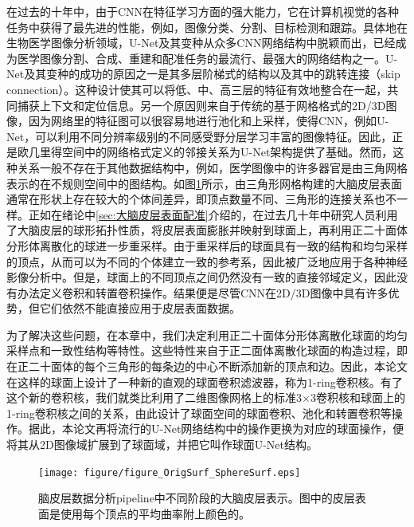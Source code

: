 在过去的十年中，由于CNN在特征学习方面的强大能力，它在计算机视觉的各种任务中获得了最先进的性能，例如，图像分类\cite{krizhevsky2012imagenet}、分割\cite{long2015fully}、目标检测和跟踪\cite{ren2015faster}。具体地在生物医学图像分析领域，U-Net\cite{ronneberger2015u}及其变种从众多CNN网络结构中脱颖而出，已经成为医学图像分割\cite{cciccek20163d}、合成\cite{nie2016estimating}、重建\cite{xiang2018ultra}和配准\cite{balakrishnan2018unsupervised}任务的最流行、最强大的网络结构之一。U-Net及其变种的成功的原因之一是其多层阶梯式的结构以及其中的跳转连接（skip connection）。这种设计使其可以将低、中、高三层的特征有效地整合在一起，共同捕获上下文和定位信息。另一个原因则来自于传统的基于网格格式的2D/3D图像，因为网络里的特征图可以很容易地进行池化和上采样，使得CNN，例如U-Net，可以利用不同分辨率级别的不同感受野分层学习丰富的图像特征。因此，正是欧几里得空间中的网络格式定义的邻接关系为U-Net架构提供了基础。然而，这种关系一般不存在于其他数据结构中，例如，医学图像中的许多器官是由三角网格表示的在不规则空间中的图结构。如图\ref{fig:figure_OrigSurf_SphereSurf}所示，由三角形网格\cite{dale1999cortical}构建的大脑皮层表面通常在形状上存在较大的个体间差异，即顶点数量不同、三角形的连接关系也不一样。正如在绪论中\ref{sec:大脑皮层表面配准}介绍的，在过去几十年中研究人员利用了大脑皮层的球形拓扑性质，将皮层表面膨胀并映射到球面上\cite{fischl2012freesurfer}，再利用正二十面体分形体离散化的球\cite{fischl1999cortical}进一步重采样。由于重采样后的球面具有一致的结构和均匀采样的顶点，从而可以为不同的个体建立一致的参考系，因此被广泛地应用于各种神经影像分析中\cite{li2019computational,glasser2013minimal}。但是，球面上的不同顶点之间仍然没有一致的直接邻域定义，因此没有办法定义卷积和转置卷积操作。结果便是尽管CNN在2D/3D图像中具有许多优势，但它们依然不能直接应用于皮层表面数据。

为了解决这些问题，在本章中，我们决定利用正二十面体分形体离散化球面的均匀采样点和一致性结构等特性。这些特性来自于正二面体离散化球面的构造过程，即在正二十面体的每个三角形的每条边的中心不断添加新的顶点和边\cite{fischl2012freesurfer}。因此，本论文在这样的球面上设计了一种新的直观的球面卷积滤波器，称为1-ring卷积核。有了这个新的卷积核，我们就类比利用了二维图像网格上的标准3$\times$3卷积核和球面上的1-ring卷积核之间的关系，由此设计了球面空间的球面卷积、池化和转置卷积等操作。据此，本论文再将流行的U-Net网络结构中的操作更换为对应的球面操作，便将其从2D图像域扩展到了球面域，并把它叫作球面U-Net结构。

\begin{figure}[t]
    \centering
    \texttt{[image: figure/figure\_OrigSurf\_SphereSurf.eps]}
    \caption{\label{fig:figure_OrigSurf_SphereSurf}脑皮层数据分析pipeline中不同阶段的大脑皮层表示。图中的皮层表面是使用每个顶点的平均曲率附上颜色的。}
\end{figure}


